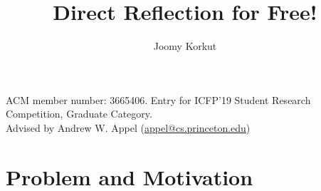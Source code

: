 \documentclass[format=acmsmall, review=false, screen=true]{acmart}
\newcommand{\lam}{\texorpdfstring{\textlambda}{lambda}}
\newcommand{\Lam}{\texorpdfstring{\textlambda}{Lambda}}
\begin{document}
\title{Direct Reflection for Free!}
\subtitle{}

\author{Joomy Korkut}

\renewcommand{\shortauthors}{Joomy Korkut}

\newcommand{\lc}{\mbox{\lam-calculus}}
\newcommand{\Lc}{\mbox{\Lam-calculus}}





\maketitle
\thispagestyle{empty}

\vspace{-2em}
\small{ACM member number: 3665406. Entry for ICFP'19 Student Research
Competition, Graduate Category.\\Advised by Andrew W. Appel (\href{mailto:appel@cs.princeton.edu}{appel@cs.princeton.edu})}
\normalsize



\section{Problem and Motivation}
\end{document}
